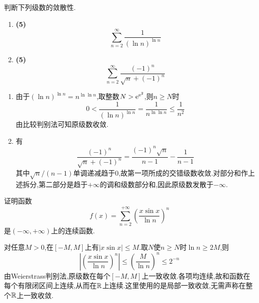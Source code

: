 \documentclass{ctexart}
\begin{document}
\begin{problem}[4.(10\songti{分})]
判断下列级数的敛散性.
        \begin{enumerate}[label=\tbf{(\arabic*)},topsep=0pt,parsep=0pt,itemsep=0pt,partopsep=0pt]
            \item \textbf{(5)}
                \[\sum_{n=2}^{\infty}\dfrac{1}{(\ln n)^{\ln n}}\]
            \item \textbf{(5)}
                \[\sum_{n=2}^{\infty}\dfrac{(-1)^n}{\sqrt{n}+(-1)^n}\]

        \end{enumerate}
\end{problem}
\begin{solution}
\begin{enumerate}[label=\tbf{(\arabic*)},topsep=0pt,parsep=0pt,itemsep=0pt,partopsep=0pt]
\item 由于$(\ln n)^{\ln n}=n^{\ln\ln n}$,取整数$N>\mathrm{e}^{\mathrm{e}^2}$,则$n\geqslant N$时
\[0<\frac{1}{(\ln n)^{\ln n}}=\frac{1}{n^{\ln\ln n}}\leqslant\frac1{n^2}\]
由比较判别法可知原级数收敛.
\item 有
\[\frac{(-1)^n}{\sqrt n+(-1)^n}=\frac{(-1)^n\sqrt n}{n-1}-\frac1{n-1}\]
其中$\sqrt n/(n-1)$单调递减趋于$0$,故第一项所成的交错级数收敛.对部分和作上述拆分,第二部分是趋于$+\infty$的调和级数部分和,因此原级数发散于$-\infty$.
\end{enumerate}
\end{solution}

\begin{problem}[5.(15\songti{分})]
证明函数
        \[f(x)=\sum_{n=2}^{+\infty}\left(\dfrac{x\sin x}{\ln n}\right)^n\]
        是$(-\infty,+\infty)$上的连续函数.
\end{problem}
\begin{solution}
对任意$M>0$,在$[-M,M]$上有$|x\sin x|\leqslant M$.取$N$使$n\geqslant N$时$\ln n\geqslant2M$,则
\[\left|\left(\frac{x\sin x}{\ln n}\right)^n\right|\leqslant\left(\frac{M}{\ln n}\right)^n\leqslant2^{-n}\]
由Weierstrass判别法,原级数在每个$[-M,M]$上一致收敛.各项均连续,故和函数在每个有限闭区间上连续,从而在$\mathbb{R}$上连续.这里使用的是局部一致收敛,无需声称在整个$\mathbb{R}$上一致收敛.
\end{solution}
\end{document}
